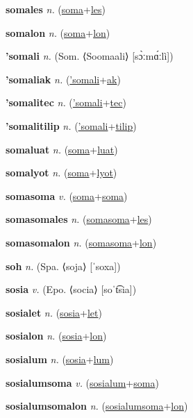 \textbf{\hypertarget{somales}{somales}} \textit{n.} (\hyperlink{soma}{soma}+\allowbreak \hyperlink{les}{les})


\textbf{\hypertarget{somalon}{somalon}} \textit{n.} (\hyperlink{soma}{soma}+\allowbreak \hyperlink{lon}{lon})


\textbf{\hypertarget{'somali}{'somali}} \textit{n.} (Som. ⟨Soomaali⟩ [sɔ̀ːmɑ́ːlì])


\textbf{\hypertarget{'somaliak}{'somaliak}} \textit{n.} (\hyperlink{'somali}{'somali}+\allowbreak \hyperlink{ak}{ak})


\textbf{\hypertarget{'somalitec}{'somalitec}} \textit{n.} (\hyperlink{'somali}{'somali}+\allowbreak \hyperlink{tec}{tec})


\textbf{\hypertarget{'somalitilip}{'somalitilip}} \textit{n.} (\hyperlink{'somali}{'somali}+\allowbreak \hyperlink{tilip}{tilip})


\textbf{\hypertarget{somaluat}{somaluat}} \textit{n.} (\hyperlink{soma}{soma}+\allowbreak \hyperlink{luat}{luat})


\textbf{\hypertarget{somalyot}{somalyot}} \textit{n.} (\hyperlink{soma}{soma}+\allowbreak \hyperlink{lyot}{lyot})


\textbf{\hypertarget{somasoma}{somasoma}} \textit{v.} (\hyperlink{soma}{soma}+\allowbreak \hyperlink{soma}{soma})


\textbf{\hypertarget{somasomales}{somasomales}} \textit{n.} (\hyperlink{somasoma}{somasoma}+\allowbreak \hyperlink{les}{les})


\textbf{\hypertarget{somasomalon}{somasomalon}} \textit{n.} (\hyperlink{somasoma}{somasoma}+\allowbreak \hyperlink{lon}{lon})


\textbf{\hypertarget{soh}{soh}} \textit{n.} (Spa. ⟨soja⟩ [ˈsoxa])


\textbf{\hypertarget{sosia}{sosia}} \textit{v.} (Epo. ⟨socia⟩ [soˈt͡sia])


\textbf{\hypertarget{sosialet}{sosialet}} \textit{n.} (\hyperlink{sosia}{sosia}+\allowbreak \hyperlink{let}{let})


\textbf{\hypertarget{sosialon}{sosialon}} \textit{n.} (\hyperlink{sosia}{sosia}+\allowbreak \hyperlink{lon}{lon})


\textbf{\hypertarget{sosialum}{sosialum}} \textit{n.} (\hyperlink{sosia}{sosia}+\allowbreak \hyperlink{lum}{lum})


\textbf{\hypertarget{sosialumsoma}{sosialumsoma}} \textit{v.} (\hyperlink{sosialum}{sosialum}+\allowbreak \hyperlink{soma}{soma})


\textbf{\hypertarget{sosialumsomalon}{sosialumsomalon}} \textit{n.} (\hyperlink{sosialumsoma}{sosialumsoma}+\allowbreak \hyperlink{lon}{lon})


